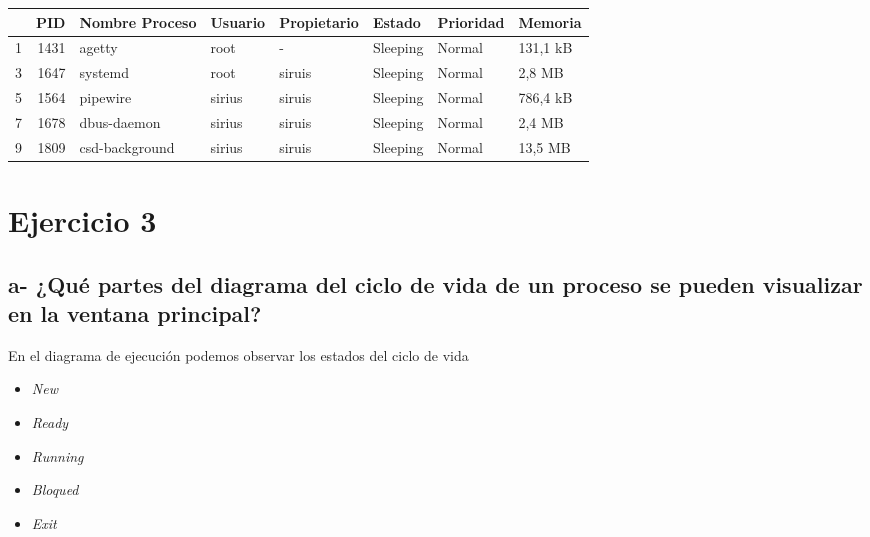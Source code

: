 \documentclass{article}
\begin{document}
\begin{table}[htbp]
  \centering
    \begin{tabular}{|rrllllll|}
    \toprule
    \rowcolor[rgb]{ .357,  .608,  .835} \multicolumn{1}{|l}{\textcolor[rgb]{ 1,  1,  1}{\textbf{Proceso}}} & \multicolumn{1}{l}{\textcolor[rgb]{ 1,  1,  1}{\textbf{PID}}} & \textcolor[rgb]{ 1,  1,  1}{\textbf{Nombre Proceso}} & \textcolor[rgb]{ 1,  1,  1}{\textbf{Usuario}} & \textcolor[rgb]{ 1,  1,  1}{\textbf{Propietario}} & \textcolor[rgb]{ 1,  1,  1}{\textbf{Estado}} & \textcolor[rgb]{ 1,  1,  1}{\textbf{Prioridad}} & \textcolor[rgb]{ 1,  1,  1}{\textbf{Memoria}} \\
    \midrule
    \rowcolor[rgb]{ .867,  .922,  .969} 1     & 1431  & agetty & root  & -     & Sleeping & Normal & 131,1 kB \\
    \midrule
    3     & 1647  & systemd & root  & siruis & Sleeping & Normal & 2,8 MB \\
    \midrule
    \rowcolor[rgb]{ .867,  .922,  .969} 5     & 1564  & pipewire & sirius & siruis & Sleeping & Normal & 786,4 kB \\
    \midrule
    7     & 1678  & dbus-daemon & sirius & siruis & Sleeping & Normal & 2,4 MB \\
    \midrule
    \rowcolor[rgb]{ .867,  .922,  .969} 9     & 1809  & csd-background & sirius & siruis & Sleeping & Normal & 13,5 MB \\
    \bottomrule
    \end{tabular}%
  \label{tab:addlabel}%
\end{table}%


\section*{Ejercicio 3}

\subsection*{a- ¿Qué partes del diagrama del ciclo de vida de un proceso se pueden visualizar en la ventana
principal?}

\noindent
En el diagrama de ejecución podemos observar los estados del ciclo de vida

\begin{itemize}
  \item \textit{New}
  \item \textit{Ready}
  \item \textit{Running}
  \item \textit{Bloqued}
  \item \textit{Exit}
\end{itemize}
\end{document}
